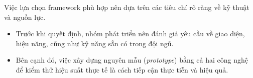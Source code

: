   Việc lựa chọn framework phù hợp nên dựa trên các tiêu chí rõ ràng về kỹ thuật và nguồn lực.

  \setlength{\leftmargini}{1.5cm}
  \begin{itemize}
    \item Trước khi quyết định, nhóm phát triển nên đánh giá yêu cầu về giao diện, hiệu năng, cũng như kỹ năng sẵn có trong đội ngũ.
    \item Bên cạnh đó, việc xây dựng nguyên mẫu (\textit{prototype}) bằng cả hai công nghệ để kiểm thử hiệu suất thực tế là cách tiếp cận thực tiễn và hiệu quả.
  \end{itemize}
